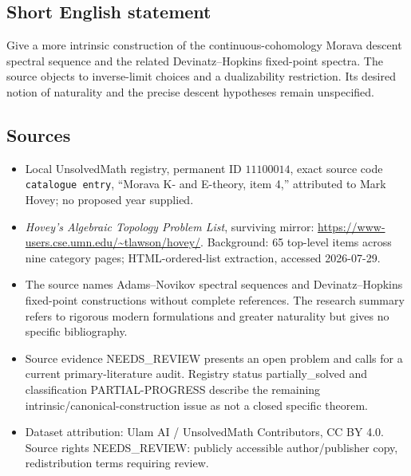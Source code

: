 \documentclass[11pt]{article}
\begin{document}
\subsection{Short English statement}
Give a more intrinsic construction of the continuous-cohomology Morava descent spectral sequence and the related Devinatz--Hopkins fixed-point spectra. The source objects to inverse-limit choices and a dualizability restriction. Its desired notion of naturality and the precise descent hypotheses remain unspecified.
\subsection{Sources}
\begin{itemize}
\item Local UnsolvedMath registry, permanent ID \(11100014\), exact source code \texttt{catalogue entry}, ``Morava K- and E-theory, item 4,'' attributed to Mark Hovey; no proposed year supplied.
\item \emph{Hovey's Algebraic Topology Problem List}, surviving mirror: \url{https://www-users.cse.umn.edu/~tlawson/hovey/}. Background: 65 top-level items across nine category pages; HTML-ordered-list extraction, accessed 2026-07-29.
\item The source names Adams--Novikov spectral sequences and Devinatz--Hopkins fixed-point constructions without complete references. The research summary refers to rigorous modern formulations and greater naturality but gives no specific bibliography.
\item Source evidence NEEDS\_REVIEW presents an open problem and calls for a current primary-literature audit. Registry status partially\_solved and classification PARTIAL-PROGRESS describe the remaining intrinsic/canonical-construction issue as not a closed specific theorem.
\item Dataset attribution: Ulam AI / UnsolvedMath Contributors, CC BY 4.0. Source rights NEEDS\_REVIEW: publicly accessible author/publisher copy, redistribution terms requiring review.
\end{itemize}
\end{document}
